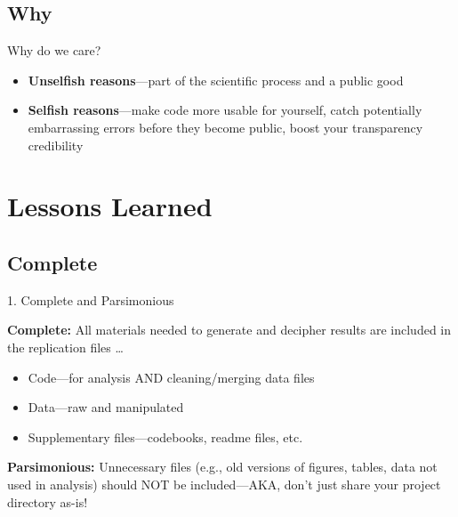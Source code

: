 \documentclass[12pt, compress]{beamer} %
\let\olditem\item %
\renewcommand{\item}{%
\olditem\vspace{\fill}}
\begin{document}
\subsection{Why}		
	\begin{frame}{Why do we care?}
		\begin{itemize}
			\item \textbf{Unselfish reasons}---part of the scientific process and a public good
			\item \textbf{Selfish reasons}---make code more usable for yourself, catch potentially embarrassing errors before they become public, boost your transparency credibility
		\end{itemize}
		
	\end{frame}
	

\section{Lessons Learned}
\subsection{Complete}
	\begin{frame}{1. Complete and Parsimonious}
	
	\textbf{Complete:} All materials needed to generate and decipher results are included in the replication files \dots

		\begin{itemize}		
			\item \textcolor{burntorange}{Code}---for analysis AND cleaning/merging data files
			\item \textcolor{burntorange}{Data}---raw and manipulated
			\item \textcolor{burntorange}{Supplementary files}---codebooks, readme files, etc.
		\end{itemize} 
		
		\bigskip
		
		
	\textbf{Parsimonious:} Unnecessary files (e.g., old versions of figures, tables, data not used in analysis) should NOT be included---\textcolor{burntorange}{AKA, don't just share your project directory as-is!}
			
	\end{frame}


\end{document}

